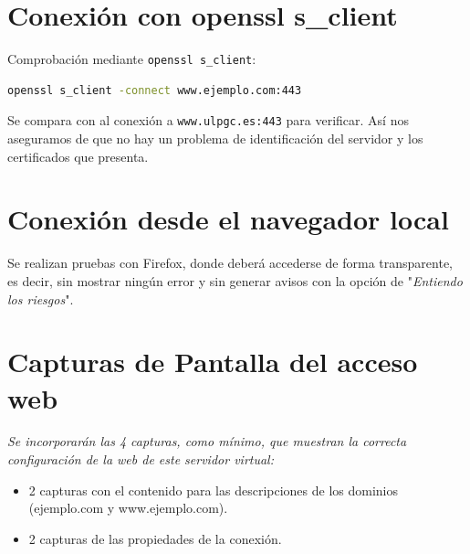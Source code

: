 \documentclass[12pt,a4paper]{report}
\begin{document}
\chapter{Conexión con openssl s\_client}
Comprobación mediante \texttt{openssl s\_client}:
\begin{lstlisting}[language=bash]
openssl s_client -connect www.ejemplo.com:443
\end{lstlisting}
Se compara con al conexión a \texttt{www.ulpgc.es:443} para verificar. Así nos aseguramos de que no hay un problema de identificación del servidor y los certificados que presenta.

\chapter{Conexión desde el navegador local}
Se realizan pruebas con Firefox, donde deberá accederse de forma transparente, es decir, sin mostrar ningún error y sin generar avisos con la opción de "\textit{Entiendo los riesgos}".

\chapter{Capturas de Pantalla del acceso web}
\textit{Se incorporarán las 4 capturas, como mínimo, que muestran la correcta configuración de la web de este servidor virtual:}
\begin{itemize}
    \item 2 capturas con el contenido para las descripciones de los dominios (ejemplo.com y www.ejemplo.com).
    \item 2 capturas de las propiedades de la conexión.
\end{itemize}
\end{document}
